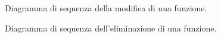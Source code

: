 \begin{figure}[H]
	\noindent
	\caption{Diagramma di sequenza della modifica di una funzione.}
\end{figure}

\begin{figure}[H]
	\noindent
	\caption{Diagramma di sequenza dell'eliminazione di una funzione.}
\end{figure}
